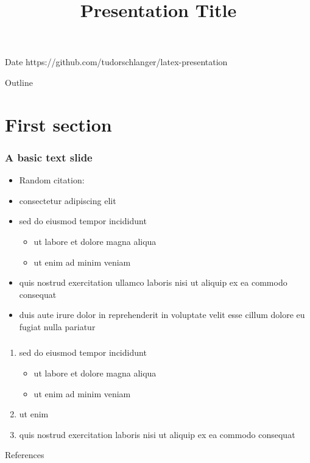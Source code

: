 \documentclass[12pt,xcolor={dvipsnames},hyperref={pdftex,pdfpagemode=UseNone,hidelinks,pdfdisplaydoctitle=true},usepdftitle=false]{beamer}
\newcommand{\bib}{bibliography.bib}
\begin{document}
\title{Presentation Title}
%
{Date}%
{https://github.com/tudorschlanger/latex-presentation}
\frame[plain]{\titlepage}

\begin{frame}{Outline}
    \tableofcontents
\end{frame}

\section{First section}

\begin{frame}
\frametitle{A basic text slide}
    \begin{itemize}
    \item Random citation: \citet{MS21a}
    \item consectetur adipiscing elit
    \item sed do eiusmod tempor incididunt
        \begin{itemize}
        \item ut labore et dolore magna aliqua
        \item ut enim ad minim veniam
        \end{itemize}
    \item quis nostrud exercitation ullamco laboris nisi ut aliquip ex ea commodo consequat
    \item duis aute irure dolor in reprehenderit in voluptate velit esse cillum dolore eu fugiat nulla pariatur
    \end{itemize}
\end{frame}

\begin{frame}
    \frametitle{\citet{LMS18a}}
    \begin{enumerate}
    \item sed do eiusmod tempor incididunt
        \begin{itemize}
        \item ut labore et dolore magna aliqua
        \item ut enim ad minim veniam
        \end{itemize}
    \item ut enim 
    \item quis nostrud exercitation  laboris nisi ut aliquip ex ea commodo consequat
    \end{enumerate}
\end{frame}

\begin{frame}[allowframebreaks]{References}
    
\end{frame}


\lastslide
\end{document}
